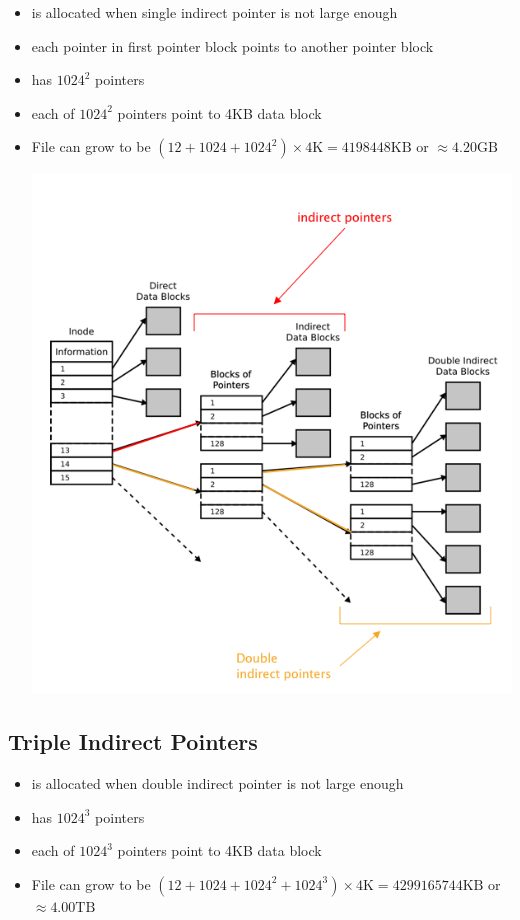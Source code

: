 \documentclass[12pt]{article}
\begin{document}
\begin{itemize}
    \item is allocated when single indirect pointer is not large enough
    \item each pointer in first pointer block points to another pointer block
    \item has $1024^2$ pointers
    \item each of $1024^2$ pointers point to 4KB data block
    \item File can grow to be $(12 + 1024 + 1024^2) \times 4\text{K} = 4198448\text{KB}$ or $\approx 4.20 \text{GB}$

    \begin{center}
    \includegraphics[width=\linewidth]{../images/midterm_2_solution_25.png}
    \end{center}
\end{itemize}

\subsection{Triple Indirect Pointers}

\begin{itemize}
    \item is allocated when double indirect pointer is not large enough
    \item has $1024^3$ pointers
    \item each of $1024^3$ pointers point to 4KB data block
    \item File can grow to be $(12 + 1024 + 1024^2 + 1024^3) \times 4\text{K} = 4299165744\text{KB}$ or $\approx 4.00 \text{TB}$
\end{itemize}
\end{document}
